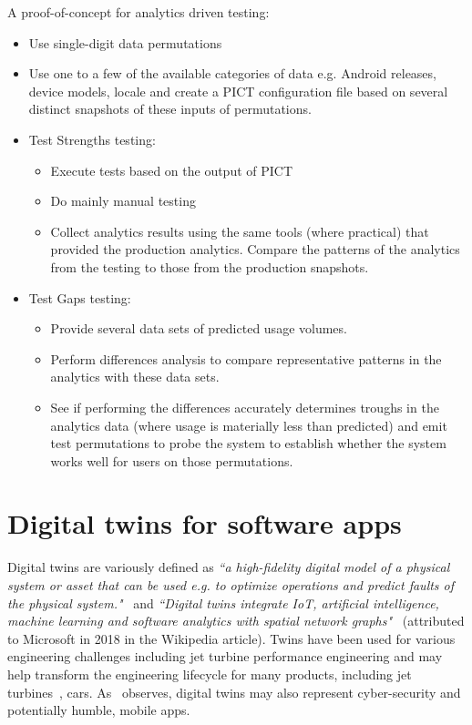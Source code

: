 A proof-of-concept for analytics driven testing: 


\begin{itemize}
    \item Use single-digit data permutations
    \item Use one to a few of the available categories of data e.g. Android releases, device models, locale and create a PICT configuration file based on several distinct snapshots of these inputs of permutations.
    \item Test Strengths testing:
    \begin{itemize}
        \item Execute tests based on the output of PICT
        \item Do mainly manual testing
        \item Collect analytics results using the same tools (where practical) that provided the production analytics. Compare the patterns of the analytics from the testing to those from the production snapshots.
    \end{itemize}
    \item Test Gaps testing:
    \begin{itemize}
        \item Provide several data sets of predicted usage volumes.
        \item Perform differences analysis to compare representative patterns in the analytics with these data sets.
        \item See if performing the differences accurately determines troughs in the analytics data (where usage is materially less than predicted) and emit test permutations to probe the system to establish whether the system works well for users on those permutations.
    \end{itemize}

\end{itemize}
 


\section{Digital twins for software apps}
Digital twins are variously defined as \emph{``a high-fidelity digital model of a physical system or asset that can be used e.g. to optimize operations and predict faults of the physical system."}~\citep{pokhrel2020_digitaltwin_for_cybersecurity} and \emph{``Digital twins integrate IoT, artificial intelligence, machine learning and software analytics with spatial network graphs"}~\citep{wikipedia__digital_twin} (attributed to Microsoft in 2018 in the Wikipedia article). Twins have been used for various engineering challenges including jet turbine performance engineering and may help transform the engineering lifecycle for many products, including jet turbines~\citep{read2018_digital_takeover_avionics}, cars. As~\citep{pokhrel2020_digitaltwin_for_cybersecurity} observes, digital twins may also represent cyber-security and potentially humble, mobile apps.


